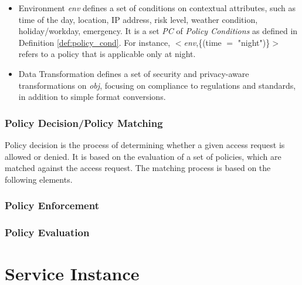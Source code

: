 \begin{definition}[Policy]
\begin{itemize}
    \item Environment \textit{env} defines a set of conditions on contextual attributes, such as time of the day, location, IP address, risk level, weather condition, holiday/workday, emergency. It is a set \emph{PC} of
          \emph{Policy Conditions} as defined in Definition \ref{def:policy_cond}.
          For instance, $<$\emph{env},\{(time $=$ "night")\}$>$ refers to a policy that is applicable only at night.

    \item Data Transformation \textit{\TF} defines a set of security and privacy-aware transformations on \textit{obj}, focusing on compliance to regulations and standards, in addition to simple format conversions.
  \end{itemize}
\end{definition}

\subsubsection{Policy Decision/Policy Matching}
Policy decision is the process of determining whether a given access request is allowed or denied. It is based on the evaluation of a set of policies, which are matched against the access request. The matching process is based on the following elements.


\subsubsection{Policy Enforcement}
\subsubsection{Policy Evaluation}
\section{Service Instance}

